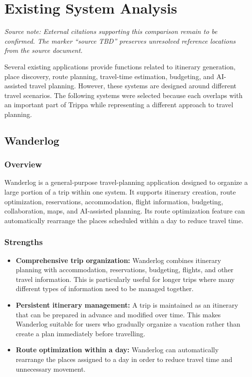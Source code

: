 \chapter{Existing System Analysis}
\label{ch:existing_system_analysis}
\noindent\textit{Source note: External citations supporting this comparison remain to be confirmed. The marker ``source TBD'' preserves unresolved reference locations from the source document.}\par\medskip
Several existing applications provide functions related to itinerary generation, place discovery, route planning, travel-time estimation, budgeting, and AI-assisted travel planning. However, these systems are designed around different travel scenarios. The following systems were selected because each overlaps with an important part of Trippa while representing a different approach to travel planning.


\section{Wanderlog}

\subsection{Overview}

Wanderlog is a general-purpose travel-planning application designed to organize a large portion of a trip within one system. It supports itinerary creation, route optimization, reservations, accommodation, flight information, budgeting, collaboration, maps, and AI-assisted planning. Its route optimization feature can automatically rearrange the places scheduled within a day to reduce travel time.


\subsection{Strengths}

\begin{itemize}
\item \textbf{Comprehensive trip organization:} Wanderlog combines itinerary planning with accommodation, reservations, budgeting, flights, and other travel information. This is particularly useful for longer trips where many different types of information need to be managed together.
\item \textbf{Persistent itinerary management:} A trip is maintained as an itinerary that can be prepared in advance and modified over time. This makes Wanderlog suitable for users who gradually organize a vacation rather than create a plan immediately before travelling.
\item \textbf{Route optimization within a day:} Wanderlog can automatically rearrange the places assigned to a day in order to reduce travel time and unnecessary movement.
\end{itemize}


